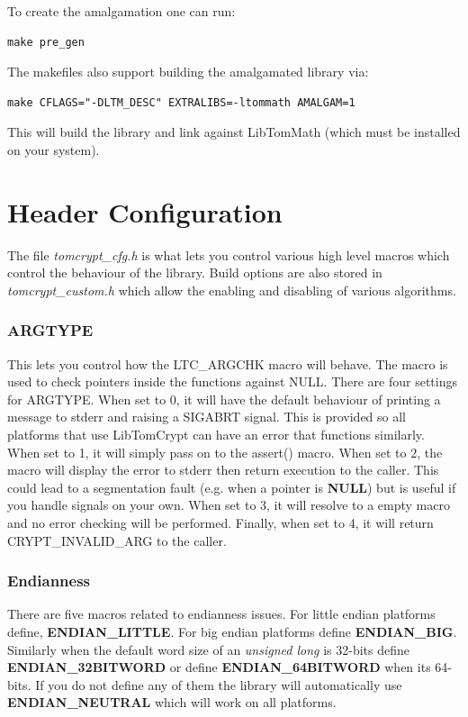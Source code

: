 \documentclass[synpaper]{book}
\newcommand{\mysection}[1]    %
	{                   %
	\section{#1}
   \markboth{\textsf{www.libtom.net}}{\thesection ~ {#1}}
	}
\begin{document}
To create the amalgamation one can run:

\begin{verbatim}
make pre_gen
\end{verbatim}

The makefiles also support building the amalgamated library via:

\begin{verbatim}
make CFLAGS="-DLTM_DESC" EXTRALIBS=-ltommath AMALGAM=1
\end{verbatim}

This will build the library and link against LibTomMath (which must be installed on your system).


\mysection{Header Configuration}
The file \textit{tomcrypt\_cfg.h} is what lets you control various high level macros which control the behaviour of the library.  Build options are also
stored in \textit{tomcrypt\_custom.h} which allow the enabling and disabling of various algorithms.

\subsubsection{ARGTYPE}
This lets you control how the LTC\_ARGCHK macro will behave.  The macro is used to check pointers inside the functions against
NULL.  There are four settings for ARGTYPE.  When set to 0, it will have the default behaviour of printing a message to
stderr and raising a SIGABRT signal.  This is provided so all platforms that use LibTomCrypt can have an error that functions
similarly.  When set to 1, it will simply pass on to the assert() macro.  When set to 2, the macro will display the error to
stderr then return execution to the caller.  This could lead to a segmentation fault (e.g. when a pointer is \textbf{NULL}) but is useful
if you handle signals on your own.  When set to 3, it will resolve to a empty macro and no error checking will be performed.  Finally, when set
to 4, it will return CRYPT\_INVALID\_ARG to the caller.

\subsubsection{Endianness}
There are five macros related to endianness issues.  For little endian platforms define, \textbf{ENDIAN\_LITTLE}.  For big endian
platforms define \textbf{ENDIAN\_BIG}.  Similarly when the default word size of an \textit{unsigned long} is 32-bits define \textbf{ENDIAN\_32BITWORD}
or define \textbf{ENDIAN\_64BITWORD} when its 64-bits.  If you do not define any of them the library will automatically use \textbf{ENDIAN\_NEUTRAL}
which will work on all platforms.
\end{document}
